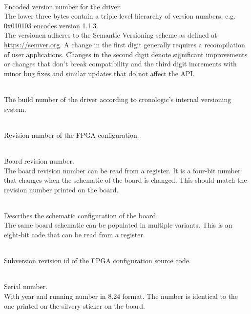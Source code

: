 \\
Encoded version number for the driver.\\
The lower three bytes contain a triple level hierarchy of version numbers, e.g. 0x010103 encodes version 1.1.3.\\
The versionen adheres to the Semantic Versioning scheme as defined at \href{https://semver.org}{https://semver.org}. A change in the first digit generally requires a recompilation of user applications. 
Changes in the second digit denote significant improvements or changes that don't break compatibility 
and the third digit increments with minor bug fixes and similar updates that do not affect the API.\par

\\
The build number of the driver according to cronologic's internal versioning system.

\\
Revision number of the FPGA configuration.

\\
Board revision number.\\
The board revision number can be read from a register. It is a four-bit number that changes when the schematic of the board is changed. This should match the revision number printed on the board.

\\
Describes the schematic configuration of the board.\\
The same board schematic can be populated in multiple variants. This is an eight-bit code that can be read from a register.

\\
Subversion revision id of the FPGA configuration source code.

\par

\\
Serial number.\\
With year and running number in 8.24 format. The number is identical to the one printed on the silvery sticker on the board.\par

